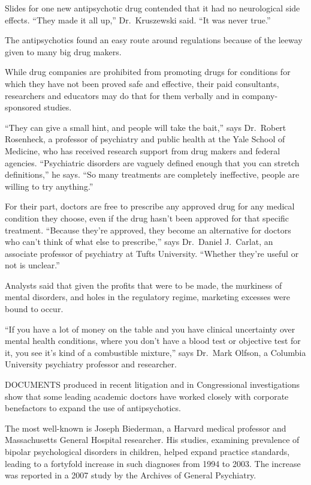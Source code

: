 ﻿\documentclass[12pt]{article}
\begin{document}
Slides for one new antipsychotic drug contended that it had no neurological side effects. ``They
made it all up,'' Dr.~Kruszewski said. ``It was never true.''

The antipsychotics found an easy route around regulations because of the leeway given to many big
drug makers.

While drug companies are prohibited from promoting drugs for conditions for which they have not been
proved safe and effective, their paid consultants, researchers and educators may do that for them
verbally and in company-sponsored studies.

``They can give a small hint, and people will take the bait,'' says Dr.~Robert Rosenheck, a
professor of psychiatry and public health at the Yale School of Medicine, who has received research
support from drug makers and federal agencies. ``Psychiatric disorders are vaguely defined enough
that you can stretch definitions,'' he says. ``So many treatments are completely ineffective, people
are willing to try anything.''

For their part, doctors are free to prescribe any approved drug for any medical condition they
choose, even if the drug hasn't been approved for that specific treatment. ``Because they're
approved, they become an alternative for doctors who can't think of what else to prescribe,'' says
Dr.~Daniel J.~Carlat, an associate professor of psychiatry at Tufts University. ``Whether they're
useful or not is unclear.''

Analysts said that given the profits that were to be made, the murkiness of mental disorders, and
holes in the regulatory regime, marketing excesses were bound to occur.

``If you have a lot of money on the table and you have clinical uncertainty over mental health
conditions, where you don't have a blood test or objective test for it, you see it's kind of a
combustible mixture,'' says Dr.~Mark Olfson, a Columbia University psychiatry professor and
researcher.

DOCUMENTS produced in recent litigation and in Congressional investigations show that some leading
academic doctors have worked closely with corporate benefactors to expand the use of antipsychotics.

The most well-known is Joseph Biederman, a Harvard medical professor and Massachusetts General
Hospital researcher. His studies, examining prevalence of bipolar psychological disorders in
children, helped expand practice standards, leading to a fortyfold increase in such diagnoses from
1994 to 2003. The increase was reported in a 2007 study by the Archives of General Psychiatry.
\end{document}
